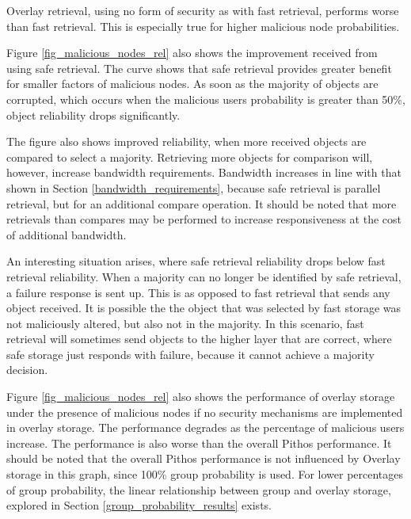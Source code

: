 Overlay retrieval, using no form of security as with fast retrieval, performs worse than fast retrieval. This is especially true for higher malicious node probabilities.

Figure \ref{fig_malicious_nodes_rel} also shows the improvement received from using safe retrieval. The curve shows that safe retrieval provides greater benefit for smaller factors of malicious nodes. As soon as the majority of objects are corrupted, which occurs when the malicious users probability is greater than 50\%, object reliability drops significantly.

The figure also shows improved reliability, when more received objects are compared to select a majority. Retrieving more objects for comparison will, however, increase bandwidth requirements. Bandwidth increases in line with that shown in Section \ref{bandwidth_requirements}, because safe retrieval is parallel retrieval, but for an additional compare operation. It should be noted that more retrievals than compares may be performed to increase responsiveness at the cost of additional bandwidth.

An interesting situation arises, where safe retrieval reliability drops below fast retrieval reliability. When a majority can no longer be identified by safe retrieval, a failure response is sent up. This is as opposed to fast retrieval that sends any object received. It is possible the the object that was selected by fast storage was not maliciously altered, but also not in the majority. In this scenario, fast retrieval will sometimes send objects to the higher layer that are correct, where safe storage just responds with failure, because it cannot achieve a majority decision.

Figure \ref{fig_malicious_nodes_rel} also shows the performance of overlay storage under the presence of malicious nodes if no security mechanisms are implemented in overlay storage. The performance degrades as the percentage of malicious users increase. The performance is also worse than the overall Pithos performance.  It should be noted that the overall Pithos performance is not influenced by Overlay storage in this graph, since 100\% group probability is used. For lower percentages of group probability, the linear relationship between group and overlay storage, explored in Section \ref{group_probability_results} exists.

